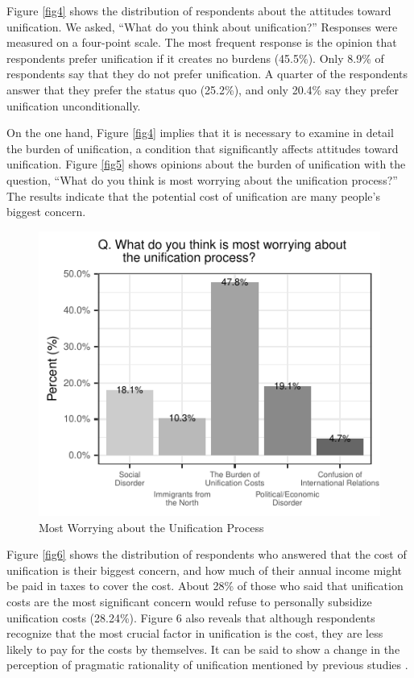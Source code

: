 \documentclass[letterpaper,9pt,twocolumn,twoside,]{pinp}
\begin{document}
Figure \ref{fig4} shows the distribution of respondents about the
attitudes toward unification. We asked, ``What do you think about
unification?'' Responses were measured on a four-point scale. The most
frequent response is the opinion that respondents prefer unification if
it creates no burdens (45.5\%). Only 8.9\% of respondents say that they
do not prefer unification. A quarter of the respondents answer that they
prefer the status quo (25.2\%), and only 20.4\% say they prefer
unification unconditionally.

On the one hand, Figure \ref{fig4} implies that it is necessary to
examine in detail the burden of unification, a condition that
significantly affects attitudes toward unification. Figure \ref{fig5}
shows opinions about the burden of unification with the question, ``What
do you think is most worrying about the unification process?'' The
results indicate that the potential cost of unification are many
people's biggest concern.

\begin{figure}[htbp]

{\centering \includegraphics{manuscript_files/figure-latex/fig5-1} 

}

\caption{\label{fig5} Most Worrying about the Unification Process}\label{fig:fig5}
\end{figure}

Figure \ref{fig6} shows the distribution of respondents who answered
that the cost of unification is their biggest concern, and how much of
their annual income might be paid in taxes to cover the cost. About 28\%
of those who said that unification costs are the most significant
concern would refuse to personally subsidize unification costs
(28.24\%). Figure 6 also reveals that although respondents recognize
that the most crucial factor in unification is the cost, they are less
likely to pay for the costs by themselves. It can be said to show a
change in the perception of pragmatic rationality of unification
mentioned by previous studies \citep{ChoHan2014}.
\end{document}
